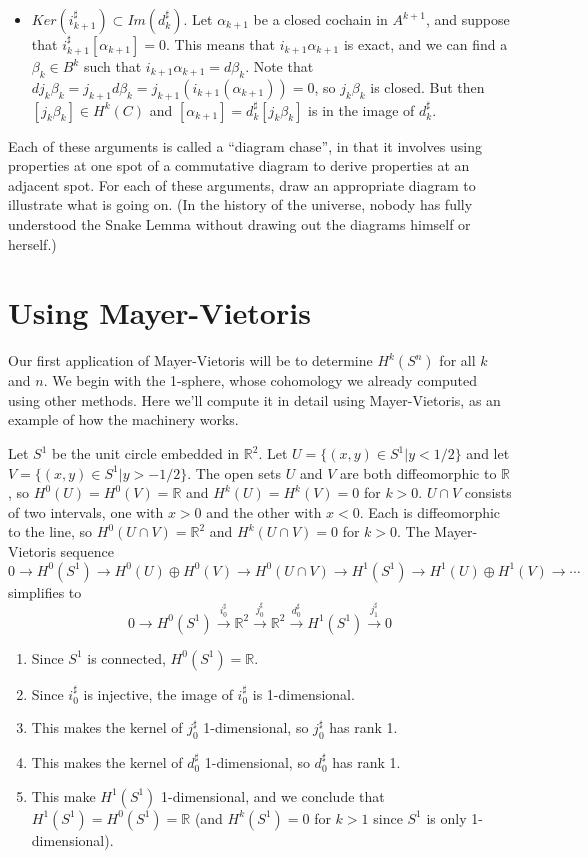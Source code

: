 \documentclass[12pt]{amsbook}
\newcommand{\R}{{\mathbb R}}
\theoremstyle{definition}
\begin{document}
\begin{itemize}
\item $Ker(i_{k+1}^\sharp)\subset Im(d_k^\sharp)$. Let $\alpha_{k+1}$ be a closed
cochain in $A^{k+1}$, and suppose that $i_{k+1}^\sharp[\alpha_{k+1}]=0$.
This means that $i_{k+1}\alpha_{k+1}$ is exact, and we can find a 
$\beta_k \in B^k$ such that $i_{k+1}\alpha_{k+1} = d\beta_k$. Note that 
$d  j_k \beta_k = j_{k+1}d\beta_k = j_{k+1}(i_{k+1}(\alpha_{k+1}))=0$, so 
$j_k\beta_k$ is closed. But then $[j_k \beta_k] \in H^k(C)$ and 
$[\alpha_{k+1}] = d_k^\sharp[j_k\beta_k]$ is in the image of $d_k^\sharp$. 
\end{itemize}

 Each of these arguments is called a 
``diagram chase'', in that it involves using properties at one spot of a 
commutative diagram to derive properties at an adjacent spot. 
For each of these arguments, draw an appropriate diagram to illustrate what is going on. (In the history of 
the universe, nobody has fully understood the Snake Lemma without drawing 
out the diagrams himself or herself.)
   
\section{Using Mayer-Vietoris}

Our first application of Mayer-Vietoris will be to determine $H^k(S^n)$  for all $k$ and $n$. We begin with the 1-sphere, whose
cohomology we already computed using other methods. Here we'll compute it in detail using Mayer-Vietoris, as an example of 
how the machinery works. 

Let $S^1$ be the unit circle embedded in $\R^2$. Let $U=\{ (x,y) \in S^1 | y < 1/2\}$ and let $V = \{ (x,y) \in S^1 | y > -1/2\}$. 
The open sets $U$ and $V$ are both diffeomorphic to $\R$, so $H^0(U)=H^0(V)=\R$ and $H^k(U)=H^k(V)=0$ for $k>0$. 
$U \cap V$ consists of two intervals, one with $x>0$ and the other with $x<0$. Each is diffeomorphic to the line, so 
$H^0(U \cap V) = \R^2$ and $H^k(U \cap V)= 0$ for $k>0$. The Mayer-Vietoris sequence
$$ 0 \to H^0(S^1) \to H^0(U) \oplus H^0(V) \to H^0(U \cap V) \to H^1(S^1) \to H^1(U)\oplus H^1(V) \to \cdots$$
simplifies to 
$$ 0 \to H^0(S^1) \xrightarrow {i_0^\sharp} \R^2 \xrightarrow {j_0^\sharp} \R^2 \xrightarrow {d_0^\sharp}
H^1(S^1) \xrightarrow {j_1^\sharp} 0 $$
\begin{enumerate}
\item Since $S^1$ is connected, $H^0(S^1)=\R$. 
\item Since $i_0^\sharp$ is injective, the image of $i_0^\sharp$ is 1-dimensional. 
\item This makes the kernel of $j_0^\sharp$ 1-dimensional, so $j_0^\sharp$ has rank 1. 
\item This makes the kernel of $d_0^\sharp$ 1-dimensional, so $d_0^\sharp$ has rank 1. 
\item This make $H^1(S^1)$ 1-dimensional, and we conclude that $H^1(S^1)=H^0(S^1)=\R$ (and $H^k(S^1)=0$ for
$k>1$ since $S^1$ is only 1-dimensional).
\end{enumerate}
\end{document}
